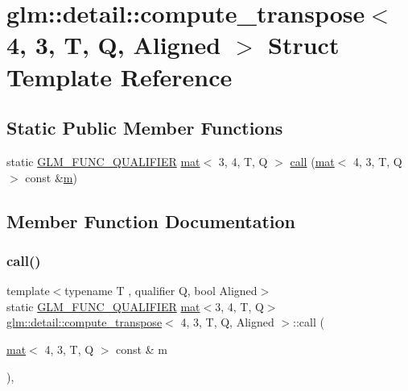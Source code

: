 \hypertarget{structglm_1_1detail_1_1compute__transpose_3_014_00_013_00_01_t_00_01_q_00_01_aligned_01_4}{}\section{glm\+:\+:detail\+:\+:compute\+\_\+transpose$<$ 4, 3, T, Q, Aligned $>$ Struct Template Reference}
\label{structglm_1_1detail_1_1compute__transpose_3_014_00_013_00_01_t_00_01_q_00_01_aligned_01_4}
\subsection*{Static Public Member Functions}
\begin{DoxyCompactItemize}
\item 
static \mbox{\hyperlink{setup_8hpp_a33fdea6f91c5f834105f7415e2a64407}{G\+L\+M\+\_\+\+F\+U\+N\+C\+\_\+\+Q\+U\+A\+L\+I\+F\+I\+ER}} \mbox{\hyperlink{structglm_1_1mat}{mat}}$<$ 3, 4, T, Q $>$ \mbox{\hyperlink{structglm_1_1detail_1_1compute__transpose_3_014_00_013_00_01_t_00_01_q_00_01_aligned_01_4_a11dcaea9624ba8b9509df70883e0256a}{call}} (\mbox{\hyperlink{structglm_1_1mat}{mat}}$<$ 4, 3, T, Q $>$ const \&\mbox{\hyperlink{_s_d_l__opengl__glext_8h_af593500c283bf1a787a6f947f503a5c2}{m}})
\end{DoxyCompactItemize}


\subsection{Member Function Documentation}
\mbox{\label{structglm_1_1detail_1_1compute__transpose_3_014_00_013_00_01_t_00_01_q_00_01_aligned_01_4_a11dcaea9624ba8b9509df70883e0256a}} 
\subsubsection{\texorpdfstring{call()}{call()}}
{\footnotesize\ttfamily template$<$typename T , qualifier Q, bool Aligned$>$ \\
static \mbox{\hyperlink{setup_8hpp_a33fdea6f91c5f834105f7415e2a64407}{G\+L\+M\+\_\+\+F\+U\+N\+C\+\_\+\+Q\+U\+A\+L\+I\+F\+I\+ER}} \mbox{\hyperlink{structglm_1_1mat}{mat}}$<$3, 4, T, Q$>$ \mbox{\hyperlink{structglm_1_1detail_1_1compute__transpose}{glm\+::detail\+::compute\+\_\+transpose}}$<$ 4, 3, T, Q, Aligned $>$\+::call (\begin{DoxyParamCaption}\item[{\mbox{\hyperlink{structglm_1_1mat}{mat}}$<$ 4, 3, T, Q $>$ const \&}]{m }\end{DoxyParamCaption})\hspace{0.3cm}{\ttfamily [inline]}, {\ttfamily [static]}}



